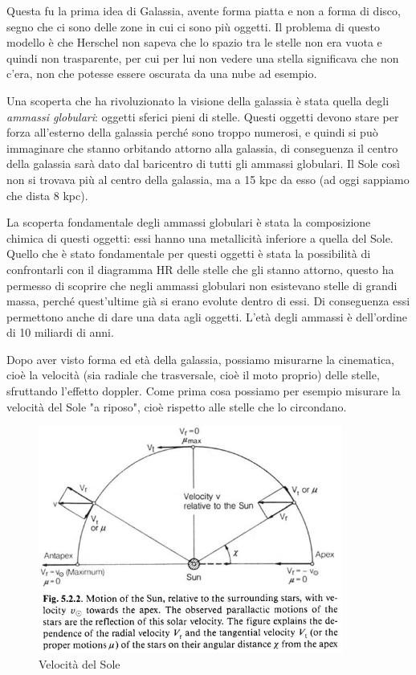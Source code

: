 Questa fu la prima idea di Galassia, avente forma piatta e non a forma di disco, segno che ci sono delle zone in cui ci sono più oggetti. Il problema di questo modello è che Herschel non sapeva che lo spazio tra le stelle non era vuota e quindi non trasparente, per cui per lui non vedere una stella significava che non c'era, non che potesse essere oscurata da una nube ad esempio.

Una scoperta che ha rivoluzionato la visione della galassia è stata quella degli \textit{ammassi globulari}: oggetti sferici pieni di stelle. Questi oggetti devono stare per forza all'esterno della galassia perché sono troppo numerosi, e quindi si può immaginare che stanno orbitando attorno alla galassia, di conseguenza il centro della galassia sarà dato dal baricentro di tutti gli ammassi globulari. Il Sole così non si trovava più al centro della galassia, ma a 15 kpc da esso (ad oggi sappiamo che dista 8 kpc).

La scoperta fondamentale degli ammassi globulari è stata la composizione chimica di questi oggetti: essi hanno una metallicità inferiore a quella del Sole. Quello che è stato fondamentale per questi oggetti è stata la possibilità di confrontarli con il diagramma HR delle stelle che gli stanno attorno, questo ha permesso di scoprire che negli ammassi globulari non esistevano stelle di grandi massa, perché quest'ultime già si erano evolute dentro di essi. Di conseguenza essi permettono anche di dare una data agli oggetti. L'età degli ammassi è dell'ordine di 10 miliardi di anni.

Dopo aver visto forma ed età della galassia, possiamo misurarne la cinematica, cioè la velocità (sia radiale che trasversale, cioè il moto proprio) delle stelle, sfruttando l'effetto doppler. Come prima cosa possiamo per esempio misurare la velocità del Sole "a riposo", cioè rispetto alle stelle che lo circondano.

\begin{figure}[H]
    \centering
    \includegraphics[width=10cm]{Velocita del Sole.JPG}
    \caption{Velocità del Sole}
\end{figure}

